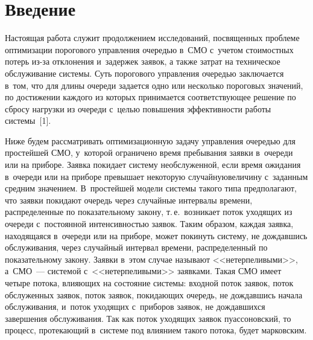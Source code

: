   
\vspace*{6pt}



\thispagestyle{headings}

\begin{multicols}{2}

\label{st\stat}

  
\section{Введение}

\vspace*{-6pt}


  Настоящая работа служит продолжением исследований, посвященных 
проблеме оптимизации порогового управления очередью в~СМО с~учетом 
стоимостных потерь из-за отклонения и~задержек заявок, а также затрат на 
техническое обслуживание системы. Суть порогового управления очередью 
заключается в~том, что для длины очереди задается одно или несколько 
пороговых значений, по достижении каждого из которых принимается 
соответствующее решение по сбросу нагрузки из очереди с~\mbox{целью} 
повышения эффективности работы сис\-те\-мы~[1]. 
  
  Ниже будем рассматривать оптимизационную задачу управления очередью для 
простейшей СМО, у~которой ограничено время 
пребывания заявки в~очереди или на приборе. Заявка покидает сис\-те\-му 
необслуженной, если время ожидания в~очереди или на приборе превышает 
некоторую случайную\linebreak величину с~заданным средним значением. В~прос\-тей\-шей 
модели системы такого типа предполагают, что заявки покидают очередь через 
случайные интервалы времени, распределенные по \mbox{показательному} закону, т.\,е.\ 
возникает поток уходящих из очереди с~постоянной интенсивностью заявок. 
Таким образом, каж\-дая заявка, на\-хо\-дя\-ща\-яся в~очереди или на приборе, может 
покинуть систему, не дождавшись обслуживания, через случайный интервал 
времени, распределенный по показательному закону. Заявки в~этом случае 
называют <<нетерпеливыми>>, а~СМО~--- сис\-те\-мой с~<<нетерпеливыми>> 
заявками. Такая СМО имеет четыре потока, влия\-ющих на со\-сто\-яние сис\-те\-мы: 
входной поток заявок, поток обслуженных заявок, поток заявок, по\-ки\-да\-ющих 
очередь, не дождавшись начала обслуживания, и~поток уходящих с~приборов 
заявок, не дождавшихся завершения обслуживания. Так как поток уходящих 
заявок пуассоновский, то процесс, протекающий в~сис\-те\-ме под влиянием такого 
потока, будет марковским. 
  

\end{multicols}
